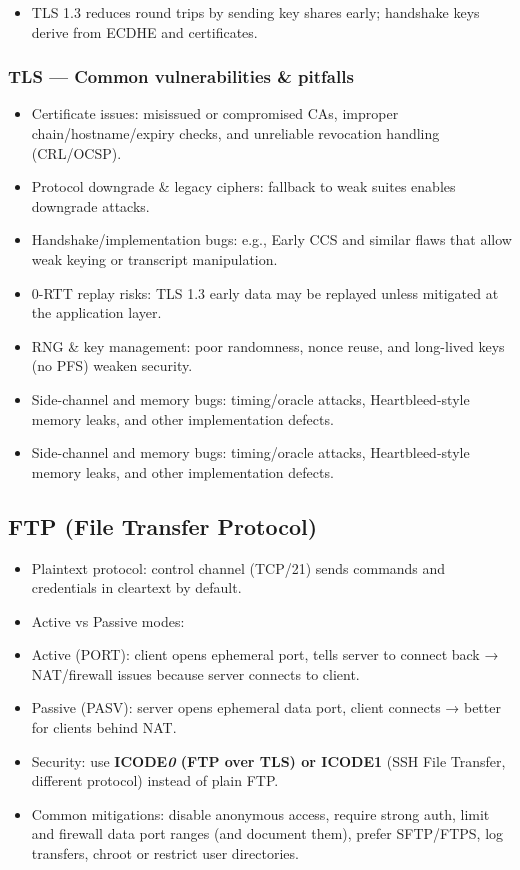 \documentclass{article}
\begin{document}
\begin{itemize}
  \item TLS 1.3 reduces round trips by sending key shares early; handshake keys derive from ECDHE and certificates.
\end{itemize}

\subsubsection{TLS — Common vulnerabilities \& pitfalls}
\begin{itemize}
  \item Certificate issues: misissued or compromised CAs, improper chain/hostname/expiry checks, and unreliable revocation handling (CRL/OCSP).
  \item Protocol downgrade \& legacy ciphers: fallback to weak suites enables downgrade attacks.
  \item Handshake/implementation bugs: e.g., Early CCS and similar flaws that allow weak keying or transcript manipulation.
  \item 0-RTT replay risks: TLS 1.3 early data may be replayed unless mitigated at the application layer.
  \item RNG \& key management: poor randomness, nonce reuse, and long-lived keys (no PFS) weaken security.
  \item Side-channel and memory bugs: timing/oracle attacks, Heartbleed-style memory leaks, and other implementation defects.
  \item Side-channel and memory bugs: timing/oracle attacks, Heartbleed-style memory leaks, and other implementation defects.
\end{itemize}

\subsection{FTP (File Transfer Protocol)}
\begin{itemize}
  \item Plaintext protocol: control channel (TCP/21) sends commands and credentials in cleartext by default.
  \item Active vs Passive modes:
  \item Active (PORT): client opens ephemeral port, tells server to connect back → NAT/firewall issues because server connects to client.
  \item Passive (PASV): server opens ephemeral data port, client connects → better for clients behind NAT.
  \item Security: use \textbf{ICODE\textit{0} (FTP over TLS) or \textbf{ICODE}1} (SSH File Transfer, different protocol) instead of plain FTP.
  \item Common mitigations: disable anonymous access, require strong auth, limit and firewall data port ranges (and document them), prefer SFTP/FTPS, log transfers, chroot or restrict user directories.
\end{itemize}
\end{document}

